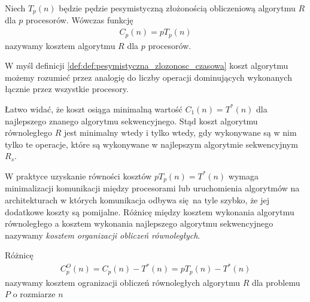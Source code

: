 \begin{definicja}
Niech \(T_{p}(n)\) będzie pędzie pesymistyczną złożonością obliczeniową algorytmu \(R\) dla \(p\) procesorów. Wówczas funkcję
\begin{align}
C_{p}(n) = p T_{p}(n)
\end{align}
nazywamy kosztem algorytmu \(R\) dla \(p\) procesorów.
\end{definicja}

W myśl definicji \ref{def:def:pesymistyczna_zlozonosc_czasowa} koszt algorytmu możemy rozumieć przez analogię do liczby operacji dominujących wykonanych łącznie przez wszystkie procesory. 


Łatwo widać, że koszt osiąga minimalną wartość \(C_{1}(n) = T^{*}(n)\) dla  najlepszego znanego algorytmu sekwencyjnego. Stąd koszt algorytmu równoległego \(R\) jest minimalny wtedy i tylko wtedy, gdy wykonywane są w nim tylko te operacje, które są wykonywane w najlepszym algorytmie sekwencyjnym \(R_s\).


W praktyce uzyskanie równości kosztów \(pT_{p}(n)=T^{*}(n)\) wymaga minimalizacji komunikacji między procesorami lub uruchomienia algorytmów na architekturach w których komunikacja odbywa się na tyle szybko, że jej dodatkowe koszty są pomijalne. Różnicę między kosztem wykonania algorytmu równoległego a kosztem wykonania najlepszego algorytmu sekwencyjnego nazywamy \emph{kosztem organizacji obliczeń równoległych}.

\begin{definicja}
Różnicę 
\begin{align}
C_{p}^{O}(n) = C_{p}(n) - T^{*}(n) = pT_{p}(n) - T^{*}(n)
\end{align}
nazywamy kosztem ogranizacji obliczeń równoległych algorytmu \(R\) dla problemu \(P\) o rozmiarze \(n\)
\end{definicja}